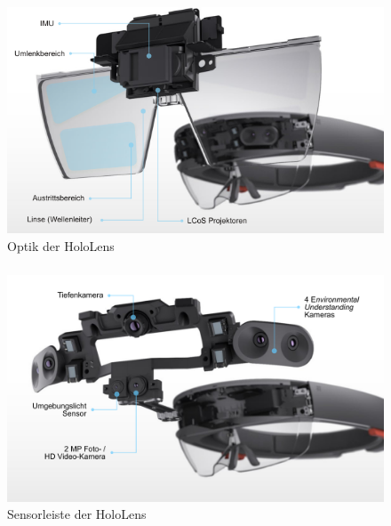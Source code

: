 \documentclass{beamer}
\begin{document}
\begin{frame}
    \frametitle{\insertsection}
    \begin{figure}
        \centering
        \includegraphics[width=.8\linewidth]{images/HoloLensOptics}
          \caption{Optik der HoloLens~\cite{Microsoft:ug}~\cite{Colaner:2016to}}
      \end{figure}
\end{frame}

\begin{frame}
    \frametitle{\insertsection}
    \begin{figure}
        \centering
        \includegraphics[width=.8\linewidth]{images/HoloLensCameras}
          \caption{Sensorleiste der HoloLens~\cite{Microsoft:tn}~\cite{Colaner:2016to}}
      \end{figure}

\end{frame}
\end{document}
